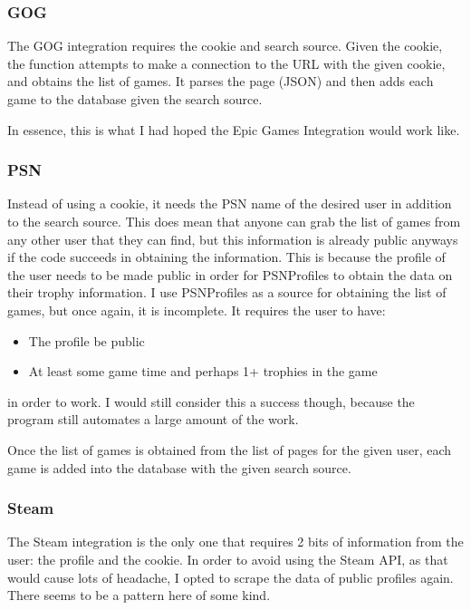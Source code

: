 \subsubsection{GOG}
\label{subsubsec:GOGInt}

The GOG integration requires the cookie and search source. Given the
cookie, the function attempts to make a connection to the URL with
the given cookie, and obtains the list of games. It parses the page (JSON)
and then adds each game to the database given the search source.

In essence, this is what I had hoped the Epic Games Integration would work like.

\subsubsection{PSN}
\label{subsubsec:PSNInt}

Instead of using a cookie, it needs the PSN name of the desired
user in addition to the search source. This does mean that anyone can
grab the list of games from any
other user that they can find, but this information is already public
anyways if the code succeeds in obtaining the information. This is
because the profile of the user needs to be made public in order for
PSNProfiles to obtain the data on their trophy information. I use
PSNProfiles as a source for obtaining the list of games, but once
again, it is incomplete.
It requires the user to have:
\begin{itemize}
	\item The profile be public
	\item At least some game time and perhaps 1+ trophies in the game
\end{itemize}
in order to work. I would still consider this a success though,
because the program still automates a large amount of the work.

Once the list of games is obtained from the list of pages for the
given user, each game is added into the database with the given search source.

\subsubsection{Steam}
\label{subsubsec:SteamInt}

The Steam integration is the only one that requires 2 bits of
information from the user: the profile and the cookie.
In order to avoid using the Steam API, as that would cause lots of
headache, I opted to scrape the data of public profiles again.
There seems to be a pattern here of some kind.

